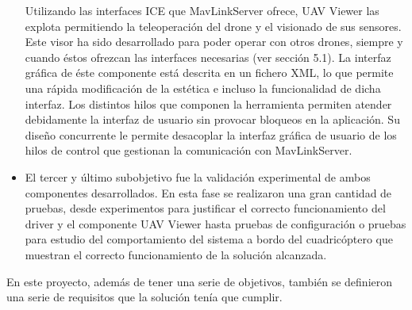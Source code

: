 \begin{itemize}
Utilizando las interfaces ICE que MavLinkServer ofrece, UAV Viewer las explota permitiendo la teleoperación del drone y el visionado de sus sensores. Este visor ha sido desarrollado para poder operar con otros drones, siempre y cuando éstos ofrezcan las interfaces necesarias (ver sección 5.1). La interfaz gráfica de éste componente está descrita en un fichero XML, lo que permite una rápida
modificación de la estética e incluso la funcionalidad de dicha interfaz. Los distintos hilos que componen la herramienta permiten atender debidamente la interfaz de usuario sin provocar bloqueos en la aplicación. Su diseño concurrente le permite desacoplar la interfaz gráfica de usuario de los hilos de control que gestionan la comunicación con MavLinkServer.

\item El tercer y último subobjetivo fue la validación experimental de ambos componentes desarrollados. En esta fase se realizaron una gran cantidad de pruebas, desde experimentos para justificar el correcto funcionamiento del driver y el componente UAV Viewer hasta pruebas de configuración o pruebas para estudio del comportamiento del sistema a bordo del cuadricóptero que muestran el correcto funcionamiento de la solución alcanzada.

\end{itemize}

En este proyecto, además de tener una serie de objetivos, también se definieron una serie de requisitos que la solución tenía que cumplir.


